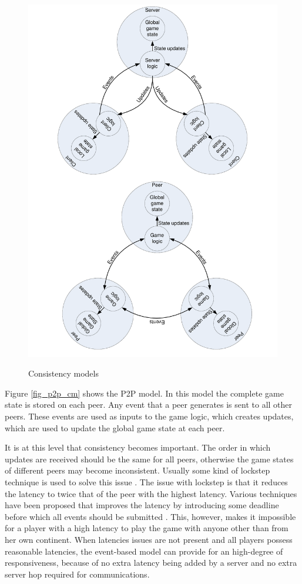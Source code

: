 \documentclass[10pt,a4paper,journal,cspaper,compsoc]{IEEEtran}
\begin{document}
\begin{figure}[htbp]
{\includegraphics[clip=true, viewport= 2.5cm 15cm 19cm 30cm, width=\columnwidth]{CS_P2P_CMs}}
\caption{Consistency models}
\end{figure}
%
Figure \ref{fig_p2p_cm} shows the P2P model. In this model the complete game state is stored on each peer. Any event that a peer generates is sent to
all other peers. These events are used as inputs to the game logic, which creates updates, which are used to update the global game state at each
peer.

It is at this level that consistency becomes important. The order in which updates are received should be the same for all peers, otherwise the game
states of different peers may become inconsistent. Usually some kind of lockstep technique is used to solve this issue \cite{pessimistic_lock_step}.
The issue with lockstep is that it reduces the latency to twice that of the peer with the highest latency. Various techniques have been proposed that
improves the latency by introducing some deadline before which all events should be submitted \cite{cheat_proof_event_ordering}. This, however, makes
it impossible for a player with a high latency to play the game with anyone other than from her own continent. When latencies issues are not present
and all players possess reasonable latencies, the event-based model can provide for an high-degree of responsiveness, because of no extra latency
being added by a server and no extra server hop required for communications.
\end{document}
